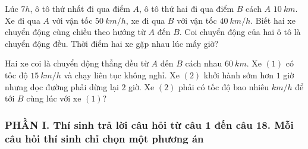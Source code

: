 \begin{ex}%
Lúc $7h$, ô tô thứ nhất đi qua điểm $A$, ô tô thứ hai đi qua điểm $B$ cách $A$ $10\ km$. Xe đi qua $A$ với vận tốc $50\ km/h$, xe đi qua $B$ với vận tốc $40\ km/h$. Biết hai xe chuyển động cùng chiều theo hướng từ $A$ đến $B$. Coi chuyển động của hai ô tô là chuyển động đều. Thời điểm hai xe gặp nhau lúc mấy giờ?
\loigiai{
}
\end{ex}
\begin{ex}%
Hai xe coi là chuyển động thẳng đều từ $A$ đến $B$ cách nhau $60\ km$. Xe $(1)$ có tốc độ $15\ km/h$ và chạy liên tục không nghỉ. Xe $(2)$ khởi hành sớm hơn $1$ giờ nhưng dọc đường phải dừng lại $2$ giờ. Xe $(2)$ phải có tốc độ bao nhiêu $km/h$ để tới $B$ cùng lúc với xe $(1)$?
\loigiai{}
\end{ex}







\newpage 
{}
\subsubsection*{PHẦN I. Thí sinh trả lời câu hỏi từ câu 1 đến câu 18. Mỗi câu hỏi thí sinh chỉ chọn một phương án}
\setcounter{ex}{0}

